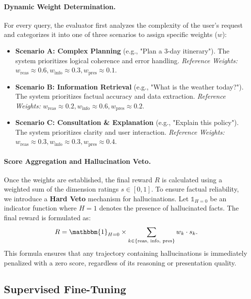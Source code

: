 \documentclass{article} %
\begin{document}
\paragraph{Dynamic Weight Determination.} For every query, the evaluator first analyzes the complexity of the user's request and categorizes it into one of three scenarios to assign specific weights ($w$):
\begin{itemize}
    \item \textbf{Scenario A: Complex Planning} (e.g., "Plan a 3-day itinerary"). The system prioritizes logical coherence and error handling. 
    \textit{Reference Weights:} $w_{\text{reas}} \approx 0.6, w_{\text{info}} \approx 0.3, w_{\text{pres}} \approx 0.1$.
    \item \textbf{Scenario B: Information Retrieval} (e.g., "What is the weather today?"). The system prioritizes factual accuracy and data extraction. 
    \textit{Reference Weights:} $w_{\text{reas}} \approx 0.2, w_{\text{info}} \approx 0.6, w_{\text{pres}} \approx 0.2$.
    \item \textbf{Scenario C: Consultation \& Explanation} (e.g., "Explain this policy"). The system prioritizes clarity and user interaction. 
    \textit{Reference Weights:} $w_{\text{reas}} \approx 0.3, w_{\text{info}} \approx 0.3, w_{\text{pres}} \approx 0.4$.
\end{itemize}

\paragraph{Score Aggregation and Hallucination Veto.}
Once the weights are established, the final reward $R$ is calculated using a weighted sum of the dimension ratings $s \in [0, 1]$. To ensure factual reliability, we introduce a \textbf{Hard Veto} mechanism for hallucinations. Let $\mathbb{1}_{H=0}$ be an indicator function where $H=1$ denotes the presence of hallucinated facts. The final reward is formulated as:
\begin{equation}
R = \mathbbm{1}_{H=0} \times \sum_{k \in \{\text{reas, info, pres}\}} w_k \cdot s_k.
\end{equation}
This formula ensures that any trajectory containing hallucinations is immediately penalized with a zero score, regardless of its reasoning or presentation quality.



\subsection{Supervised Fine-Tuning} \label{sec:sft}
\end{document}
